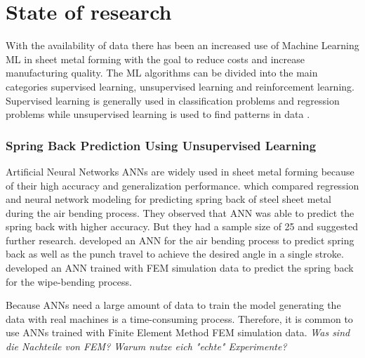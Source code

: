 \section{State of research}
With the availability of data there has been an increased use of Machine Learning \ac{ML} in sheet metal forming with the goal to reduce costs and increase manufacturing quality.
\cite{bock_reviewapplicationmachine_2019} \cite[]{cao_manufacturingadvancedsmart_2019} %
The ML algorithms can be divided into the main categories supervised learning, unsupervised learning and reinforcement learning. \cite[]{liu_reinforcementlearningfreeform_2020}
Supervised learning is generally used in classification problems and regression problems while unsupervised learning is used to find patterns in data \cite[p. 2]{cruz_applicationmachinelearning_2021}.

\subsubsection*{Spring Back Prediction Using Unsupervised Learning}
Artificial Neural Networks \ac{ANN}s are widely used in sheet metal forming because of their high accuracy and generalization performance. \cite[p. 2]{cruz_applicationmachinelearning_2021} \cite[]{narayanasamy_comparisonregressionartificial_2012a} which compared regression and neural network modeling for predicting spring back of steel sheet metal during the air bending process.  
They observed that ANN was able to predict the spring back with higher accuracy. But they had a sample size of 25 and suggested further research. 
\cite[]{inamdar_developmentartificialneural_2000} developed an ANN for the air bending process to predict spring back as well as the punch travel to achieve the desired angle in a single stroke.
\cite[]{kazan_predictionspringbackwipebending_2009} developed an ANN trained with FEM simulation data to predict the spring back for the wipe-bending process.


Because \ac{ANN}s need a large amount of data to train the model generating the data with real machines is a time-consuming process.
Therefore, it is common to use \ac{ANN}s trained with Finite Element Method \ac{FEM} simulation data.
\textit{Was sind die Nachteile von FEM? Warum nutze eich "echte" Experimente?}

